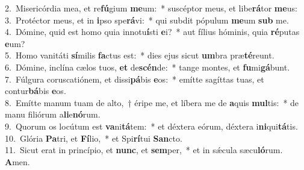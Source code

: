 {2.~}Misericórdia mea, et re\textbf{fú}gium \textbf{me}um:~* suscéptor meus, et libe\textbf{rá}tor \textbf{me}us:\\
{3.~}Protéctor meus, et in \textbf{i}pso spe\textbf{rá}vi:~* qui subdit pópulum \textbf{me}um \textbf{sub} me.\\
{4.~}Dómine, quid est homo quia innotu\textbf{í}sti \textbf{e}i?~* aut fílius hóminis, quia \textbf{ré}putas \textbf{e}um?\\
{5.~}Homo vanitáti \textbf{sí}milis \textbf{fa}ctus est:~* dies ejus sicut \textbf{um}bra præ\textbf{té}reunt.\\
{6.~}Dómine, inclína cælos tuos, \textbf{et} de\textbf{scén}de:~* tange montes, et \textbf{fu}mi\textbf{gá}bunt.\\
{7.~}Fúlgura coruscatiónem, et dissi\textbf{pá}bis \textbf{e}os:~* emítte sagíttas tuas, et contur\textbf{bá}bis \textbf{e}os.\\
{8.~}Emítte manum tuam de alto,~† éripe me, et líbera me de \textbf{a}quis \textbf{mul}tis:~* de manu filiórum a\textbf{li}e\textbf{nó}rum.\\
{9.~}Quorum os locútum est \textbf{va}ni\textbf{tá}tem:~* et déxtera eórum, déxtera i\textbf{ni}qui\textbf{tá}tis.\\
{10.~}Glória \textbf{Pa}tri, et \textbf{Fí}lio,~* et Spi\textbf{rí}tui \textbf{San}cto.\\
{11.~}Sicut erat in princípio, et \textbf{nunc}, et \textbf{sem}per,~* et in sǽcula sæcu\textbf{ló}rum. \textbf{A}men.\\
